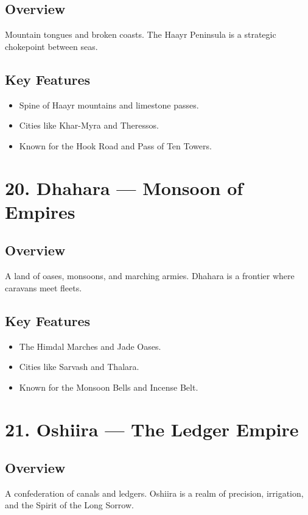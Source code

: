 \documentclass[11pt]{article}
\begin{document}
\subsection*{Overview}
Mountain tongues and broken coasts. The Haayr Peninsula is a strategic chokepoint between seas.

\subsection*{Key Features}
\begin{itemize}[leftmargin=*]
    \item Spine of Haayr mountains and limestone passes.
    \item Cities like Khar-Myra and Theressos.
    \item Known for the Hook Road and Pass of Ten Towers.
\end{itemize}

\section*{20. Dhahara — Monsoon of Empires}

\subsection*{Overview}
A land of oases, monsoons, and marching armies. Dhahara is a frontier where caravans meet fleets.

\subsection*{Key Features}
\begin{itemize}[leftmargin=*]
    \item The Himdal Marches and Jade Oases.
    \item Cities like Sarvash and Thalara.
    \item Known for the Monsoon Bells and Incense Belt.
\end{itemize}

\section*{21. Oshiira — The Ledger Empire}

\subsection*{Overview}
A confederation of canals and ledgers. Oshiira is a realm of precision, irrigation, and the Spirit of the Long Sorrow.
\end{document}
